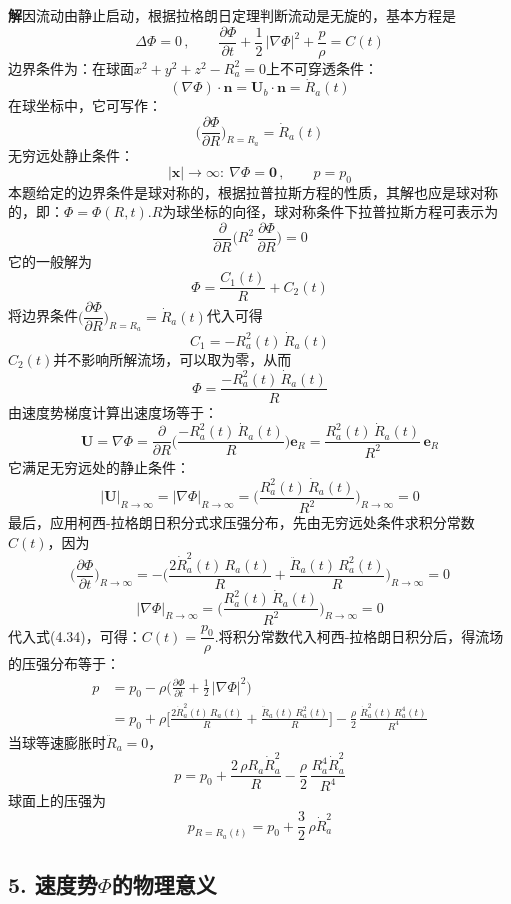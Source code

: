 \noindent\textbf{解}\quad 因流动由静止启动，根据拉格朗日定理判断流动是无旋的，基本方程是
\[
\Delta\Phi=0\,,\qquad \frac{\partial\Phi}{\partial t}+\frac{1}{2}\,|\nabla\Phi|^{2}+\frac{p}{\rho}=C(t)
\]
边界条件为：在球面$x^{2}+y^{2}+z^{2}-R_a^{2}=0$上不可穿透条件：
\[
(\nabla\Phi)\cdot\boldsymbol{n}=\boldsymbol{U}_b\cdot\boldsymbol{n}=\dot{R}_a(t)
\]
在球坐标中，它可写作：
\[
\Big(\frac{\partial\Phi}{\partial R}\Big)_{R=R_a}=\dot{R}_a(t)
\]
无穷远处静止条件：
\[
|\boldsymbol{x}|\to\infty:\ \nabla\Phi=\boldsymbol{0}\,,\qquad p=p_0
\]
本题给定的边界条件是球对称的，根据拉普拉斯方程的性质，其解也应是球对称的，即：$\Phi=\Phi(R,t)$.$R$为球坐标的向径，球对称条件下拉普拉斯方程可表示为
\[
\frac{\partial}{\partial R}\Big(R^{2}\,\frac{\partial\Phi}{\partial R}\Big)=0
\]
它的一般解为
\[
\Phi=\frac{C_1(t)}{R}+C_2(t)
\]
将边界条件$\Big(\dfrac{\partial\Phi}{\partial R}\Big)_{R=R_a}=\dot{R}_a(t)$代入可得
\[
C_1=-R_a^{2}(t)\,\dot{R}_a(t)
\]
$C_2(t)$并不影响所解流场，可以取为零，从而
\[
\Phi=\frac{-R_a^{2}(t)\,\dot{R}_a(t)}{R}
\]
由速度势梯度计算出速度场等于：
\[
\boldsymbol{U}=\nabla\Phi=\frac{\partial}{\partial R}\Big(\frac{-R_a^{2}(t)\,\dot{R}_a(t)}{R}\Big)\boldsymbol{e}_R=\frac{R_a^{2}(t)\,\dot{R}_a(t)}{R^{2}}\,\boldsymbol{e}_R
\]
它满足无穷远处的静止条件：
\[
|\boldsymbol{U}|_{R\to\infty}=|\nabla\Phi|_{R\to\infty}=\Big(\frac{R_a^{2}(t)\,\dot{R}_a(t)}{R^{2}}\Big)_{R\to\infty}=0
\]
最后，应用柯西-拉格朗日积分式求压强分布，先由无穷远处条件求积分常数$C(t)$，因为
\[
\Big(\frac{\partial\Phi}{\partial t}\Big)_{R\to\infty}=-\Big(\frac{2\dot{R}_a^{2}(t)\,R_a(t)}{R}+\frac{\ddot{R}_a(t)\,R_a^{2}(t)}{R}\Big)_{R\to\infty}=0
\]
\[
|\nabla\Phi|_{R\to\infty}=\Big(\frac{R_a^{2}(t)\,\dot{R}_a(t)}{R^{2}}\Big)_{R\to\infty}=0
\]
代入式(4.34)，可得：$C(t)=\dfrac{p_0}{\rho}$.将积分常数代入柯西-拉格朗日积分后，得流场的压强分布等于：
\begin{align*}
p&=p_0-\rho\Big(\frac{\partial\Phi}{\partial t}+\frac{1}{2}\,|\nabla\Phi|^{2}\Big)\\
&=p_0+\rho\bigg[\frac{2\dot{R}_a^{2}(t)\,R_a(t)}{R}+\frac{\ddot{R}_a(t)\,R_a^{2}(t)}{R}\bigg]-\frac{\rho}{2}\,\frac{\dot{R}_a^{2}(t)\,R_a^{4}(t)}{R^{4}}
\end{align*}
当球等速膨胀时$\ddot{R}_a=0$，
\[
p=p_0+\frac{2\,\rho R_a\dot{R}_a^{2}}{R}-\frac{\rho}{2}\,\frac{R_a^{4}\dot{R}_a^{2}}{R^{4}}
\]
球面上的压强为
\[
p_{R=R_a(t)}=p_0+\frac{3}{2}\,\rho\dot{R}_a^{2}
\]

\subsection*{5. 速度势$\Phi$的物理意义}


